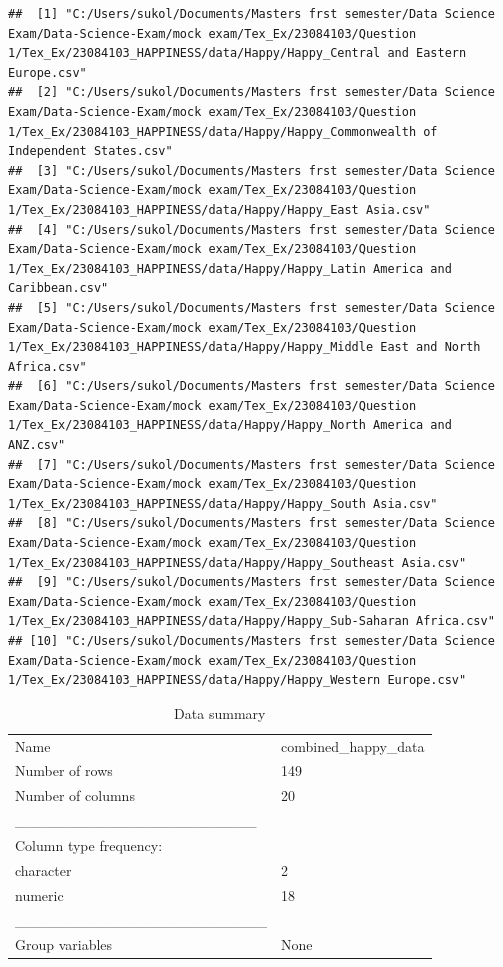 \documentclass[11pt,preprint]{elsarticle}
\numberwithin{equation}{section}
\numberwithin{figure}{section}
\numberwithin{table}{section}
\begin{document}
\begin{verbatim}
##  [1] "C:/Users/sukol/Documents/Masters frst semester/Data Science Exam/Data-Science-Exam/mock exam/Tex_Ex/23084103/Question 1/Tex_Ex/23084103_HAPPINESS/data/Happy/Happy_Central and Eastern Europe.csv"        
##  [2] "C:/Users/sukol/Documents/Masters frst semester/Data Science Exam/Data-Science-Exam/mock exam/Tex_Ex/23084103/Question 1/Tex_Ex/23084103_HAPPINESS/data/Happy/Happy_Commonwealth of Independent States.csv"
##  [3] "C:/Users/sukol/Documents/Masters frst semester/Data Science Exam/Data-Science-Exam/mock exam/Tex_Ex/23084103/Question 1/Tex_Ex/23084103_HAPPINESS/data/Happy/Happy_East Asia.csv"                         
##  [4] "C:/Users/sukol/Documents/Masters frst semester/Data Science Exam/Data-Science-Exam/mock exam/Tex_Ex/23084103/Question 1/Tex_Ex/23084103_HAPPINESS/data/Happy/Happy_Latin America and Caribbean.csv"       
##  [5] "C:/Users/sukol/Documents/Masters frst semester/Data Science Exam/Data-Science-Exam/mock exam/Tex_Ex/23084103/Question 1/Tex_Ex/23084103_HAPPINESS/data/Happy/Happy_Middle East and North Africa.csv"      
##  [6] "C:/Users/sukol/Documents/Masters frst semester/Data Science Exam/Data-Science-Exam/mock exam/Tex_Ex/23084103/Question 1/Tex_Ex/23084103_HAPPINESS/data/Happy/Happy_North America and ANZ.csv"             
##  [7] "C:/Users/sukol/Documents/Masters frst semester/Data Science Exam/Data-Science-Exam/mock exam/Tex_Ex/23084103/Question 1/Tex_Ex/23084103_HAPPINESS/data/Happy/Happy_South Asia.csv"                        
##  [8] "C:/Users/sukol/Documents/Masters frst semester/Data Science Exam/Data-Science-Exam/mock exam/Tex_Ex/23084103/Question 1/Tex_Ex/23084103_HAPPINESS/data/Happy/Happy_Southeast Asia.csv"                    
##  [9] "C:/Users/sukol/Documents/Masters frst semester/Data Science Exam/Data-Science-Exam/mock exam/Tex_Ex/23084103/Question 1/Tex_Ex/23084103_HAPPINESS/data/Happy/Happy_Sub-Saharan Africa.csv"                
## [10] "C:/Users/sukol/Documents/Masters frst semester/Data Science Exam/Data-Science-Exam/mock exam/Tex_Ex/23084103/Question 1/Tex_Ex/23084103_HAPPINESS/data/Happy/Happy_Western Europe.csv"
\end{verbatim}

\begin{longtable}[]{@{}ll@{}}
\caption{Data summary}\tabularnewline
\toprule\noalign{}
\endfirsthead
\endhead
\bottomrule\noalign{}
\endlastfoot
Name & combined\_happy\_data \\
Number of rows & 149 \\
Number of columns & 20 \\
\_\_\_\_\_\_\_\_\_\_\_\_\_\_\_\_\_\_\_\_\_\_\_ & \\
Column type frequency: & \\
character & 2 \\
numeric & 18 \\
\_\_\_\_\_\_\_\_\_\_\_\_\_\_\_\_\_\_\_\_\_\_\_\_ & \\
Group variables & None \\
\end{longtable}
\end{document}
